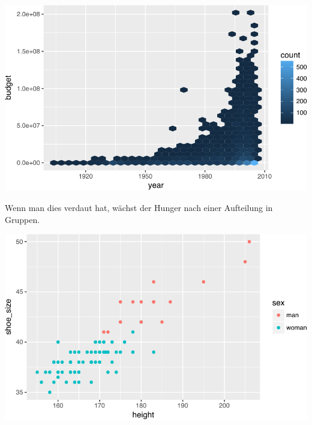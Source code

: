 \documentclass[12pt,ngerman,]{book}
\newenvironment{Shaded}{\begin{snugshade}}{\end{snugshade}}
\newcommand{\KeywordTok}[1]{\textcolor[rgb]{0.13,0.29,0.53}{\textbf{{#1}}}}
\newcommand{\DataTypeTok}[1]{\textcolor[rgb]{0.13,0.29,0.53}{{#1}}}
\newcommand{\DecValTok}[1]{\textcolor[rgb]{0.00,0.00,0.81}{{#1}}}
\newcommand{\StringTok}[1]{\textcolor[rgb]{0.31,0.60,0.02}{{#1}}}
\newcommand{\NormalTok}[1]{{#1}}
\renewenvironment{Shaded}{\begin{kframe}}{\end{kframe}}
\begin{document}
\begin{center}\includegraphics[width=0.7\linewidth]{050_Daten_visualisieren_files/figure-latex/flights_hexbin-1} \end{center}

Wenn man dies verdaut hat, wächst der Hunger nach einer Aufteilung in
Gruppen.

\begin{Shaded}
\end{Shaded}

\begin{center}\includegraphics[width=0.7\linewidth]{050_Daten_visualisieren_files/figure-latex/fig-aes-color-1} \end{center}
\end{document}
